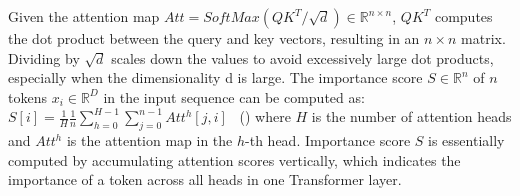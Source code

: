 \setcounter{equation}{0}
Given the attention map $Att = SoftMax(QK^{T} / \sqrt{d}) \in \mathbb{R}^{n \times n}$, $QK^T$ computes the dot product between the query and key vectors, resulting in an  $n \times n$ matrix. Dividing by $\sqrt{d}$ scales down the values to avoid excessively large dot products, especially when the dimensionality d  is large. The importance score $S \in \mathbb{R}^{n}$ of $n$ tokens $x_i \in \mathbb{R}^{D}$ in the input sequence can be computed as: $S[i] = \frac{1}{H} \frac{1}{n} \sum_{h=0}^{H-1} \sum_{j=0}^{n-1} Att^{h}[j,i]$ \label{e:score}~(\theequation) 
where $H$ is the number of attention heads and $Att^{h}$ is the attention map in the $h$-th head. Importance score $S$ is essentially computed by accumulating attention scores vertically, which indicates the importance of a token across all heads in one Transformer layer.

